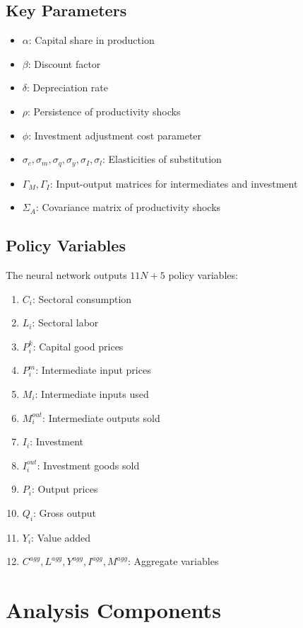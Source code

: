 \documentclass[11pt]{article}
\begin{document}
\subsection{Key Parameters}
\begin{itemize}
    \item $\alpha$: Capital share in production
    \item $\beta$: Discount factor
    \item $\delta$: Depreciation rate
    \item $\rho$: Persistence of productivity shocks
    \item $\phi$: Investment adjustment cost parameter
    \item $\sigma_c, \sigma_m, \sigma_q, \sigma_y, \sigma_I, \sigma_l$: Elasticities of substitution
    \item $\Gamma_M, \Gamma_I$: Input-output matrices for intermediates and investment
    \item $\Sigma_A$: Covariance matrix of productivity shocks
\end{itemize}

\subsection{Policy Variables}
The neural network outputs $11N + 5$ policy variables:
\begin{enumerate}
    \item $C_i$: Sectoral consumption
    \item $L_i$: Sectoral labor
    \item $P^k_i$: Capital good prices
    \item $P^m_i$: Intermediate input prices
    \item $M_i$: Intermediate inputs used
    \item $M^{out}_i$: Intermediate outputs sold
    \item $I_i$: Investment
    \item $I^{out}_i$: Investment goods sold
    \item $P_i$: Output prices
    \item $Q_i$: Gross output
    \item $Y_i$: Value added
    \item $C^{agg}, L^{agg}, Y^{agg}, I^{agg}, M^{agg}$: Aggregate variables
\end{enumerate}

\section{Analysis Components}
\end{document}
